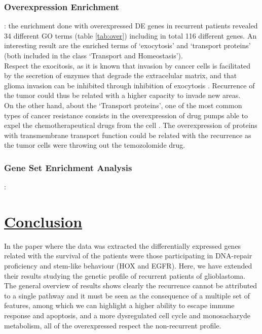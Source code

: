 \documentclass[9pt,twocolumn,twoside]{gsajnl}
\begin{document}
\subsubsection*{Overexpression Enrichment}: the enrichment done with overexpressed DE genes in recurrent patients revealed 34 different GO terms (table \ref{tab:over}) including in total 116 different genes. An interesting result are the enriched terms of `exocytosis' and `transport proteins' (both included in the class `Transport and Homeostasis').\\
Respect the exocitosis, as it is known that invasion by cancer cells is facilitated by the secretion of enzymes that degrade the extracelular matrix, and that glioma invasion can be inhibited through inhibition of exocytosis \citep{Liu2012}. Recurrence of the tumor could thus be related with a higher capacity to invade new areas.\\
On the other hand, about the `Transport proteins', one of the most common types of cancer resistance consists in the overexpression of drug pumps able to expel the chemotherapeutical drugs from the cell \citep{Borst2012}. The overexpression of proteins with transmembrane transport function could be related with the recurrence as the tumor cells were throwing out the temozolomide drug.

\subsubsection*{Gene Set Enrichment Analysis}:


\section*{\underline{Conclusion}}
In the paper where the data was extracted \citep{Murat2008} the differentially expressed genes related with the survival of the patients were those participating in DNA-repair proficiency and stem-like behaviour (HOX and EGFR). Here, we have extended their results studying the genetic profile of recurrent patients of glioblastoma. The general overview of results shows clearly the recurrence cannot be attributed to a single pathway and it must be seen as the consequence of a multiple set of features, among which we can highlight a higher ability to escape immune response and apoptosis, and a more dysregulated cell cycle and monosacharyde metabolism, all of the overexpressed respect the non-recurrent profile.
\end{document}
